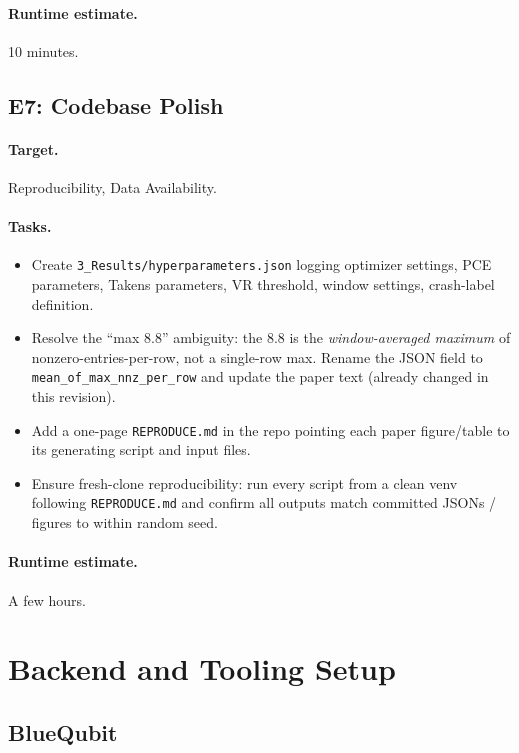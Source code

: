 \documentclass[11pt]{article}
\begin{document}
\paragraph*{Runtime estimate.} 10 minutes.

\subsection{E7: Codebase Polish}

\paragraph*{Target.} Reproducibility, Data Availability.

\paragraph*{Tasks.}
\begin{itemize}[leftmargin=*]
  \item Create \texttt{3\_Results/hyperparameters.json} logging
        optimizer settings, PCE parameters, Takens parameters, VR
        threshold, window settings, crash-label definition.
  \item Resolve the ``max 8.8'' ambiguity: the 8.8 is the
        \emph{window-averaged maximum} of nonzero-entries-per-row,
        not a single-row max. Rename the JSON field to
        \texttt{mean\_of\_max\_nnz\_per\_row} and update the paper
        text (already changed in this revision).
  \item Add a one-page \texttt{REPRODUCE.md} in the repo pointing
        each paper figure/table to its generating script and input
        files.
  \item Ensure fresh-clone reproducibility: run every script from a
        clean venv following \texttt{REPRODUCE.md} and confirm all
        outputs match committed JSONs / figures to within random
        seed.
\end{itemize}

\paragraph*{Runtime estimate.} A few hours.

\section{Backend and Tooling Setup}

\subsection{BlueQubit}
\end{document}
